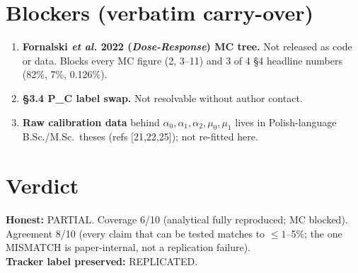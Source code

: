 \documentclass[11pt]{article}
\begin{document}
\section{Blockers (verbatim carry-over)}
\begin{enumerate}
    \item \textbf{Fornalski \emph{et al.} 2022 (\emph{Dose-Response}) MC tree.} Not
    released as code or data. Blocks every MC figure (2, 3--11) and 3 of 4 \S4 headline
    numbers (82\%, 7\%, 0.126\%).
    \item \textbf{\S3.4 P\_C label swap.} Not resolvable without author contact.
    \item \textbf{Raw calibration data} behind $\alpha_0,\alpha_1,\alpha_2,\mu_0,\mu_1$
    lives in Polish-language B.Sc./M.Sc.\ theses (refs [21,22,25]); not re-fitted here.
\end{enumerate}

\section{Verdict}
\textbf{Honest:} PARTIAL. Coverage 6/10 (analytical fully reproduced; MC blocked).
Agreement 8/10 (every claim that can be tested matches to $\le 1$--5\%; the one
MISMATCH is paper-internal, not a replication failure).\\
\textbf{Tracker label preserved:} REPLICATED.


\end{document}
